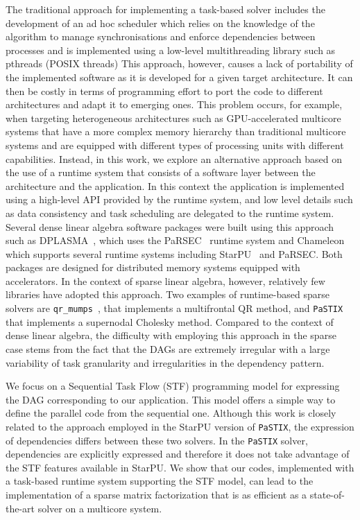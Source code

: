 \documentclass{article}
\newcommand{\starpu}{{StarPU}\xspace}
\newcommand{\parsec}{{PaRSEC}\xspace}
\newcommand{\qrm}{\texttt{qr\_mumps}\xspace}
\newcommand{\pastix}{\texttt{PaSTIX}\xspace}
\begin{document}
The traditional approach for implementing a task-based solver includes
the development of an ad hoc scheduler which relies on the knowledge
of the algorithm 
to manage synchronisations and
enforce dependencies between processes and
is implemented using a low-level multithreading
library such as pthreads (POSIX threads) 
This approach, however, causes a
lack of portability of the implemented software as it is developed for
a given target architecture. It can then be costly in terms of
programming effort to port the code to different architectures and
adapt it to emerging ones. This problem occurs, for example, when
targeting heterogeneous architectures such as GPU-accelerated
multicore systems that have a more complex memory hierarchy than
traditional multicore systems and are equipped with  different types of
processing units with different capabilities. Instead, in this work,
we explore an alternative approach based on the use of a runtime
system that consists of a software layer between the architecture and
the application. In this context the application is implemented using
a high-level API provided by the runtime system, and low level details
such as data consistency and task scheduling
are delegated to the runtime system. Several dense linear algebra
software packages were built using this approach such as
DPLASMA~\cite{b.b.d.f.ea:11}, which uses the
\parsec~\cite{b.b.d.f.ea:13} runtime system and Chameleon which
supports several runtime systems including \starpu~\cite{a.t.n.w:11}
and \parsec. Both packages are designed for distributed memory systems
equipped with accelerators. In the context of sparse linear algebra,
however, relatively few libraries have adopted this approach. Two
examples of runtime-based sparse solvers are \qrm~\cite{a.b.g.l.:14},
that implements a multifrontal QR method, and \pastix~\cite{h.r.r:02}
that implements a supernodal Cholesky method. Compared to the context
of dense linear algebra, the difficulty with employing this approach in
the sparse case stems from the fact that the DAGs are extremely irregular
with a large variability of task granularity and irregularities in the
dependency pattern.

We focus on a Sequential Task Flow (STF) programming model for
expressing the DAG corresponding to our application. This model
offers a simple way to define the parallel code from
the sequential one. Although this work is closely related to the
approach employed in the \starpu version of \pastix, the expression of
dependencies differs between these two solvers. In the \pastix solver,
dependencies are explicitly expressed and therefore it does not take
advantage of the STF features available in \starpu. We show that our
codes, implemented with a task-based runtime system supporting the STF
model, can lead to the implementation of a sparse matrix factorization
that is as efficient as a state-of-the-art solver on a multicore
system.
\end{document}
